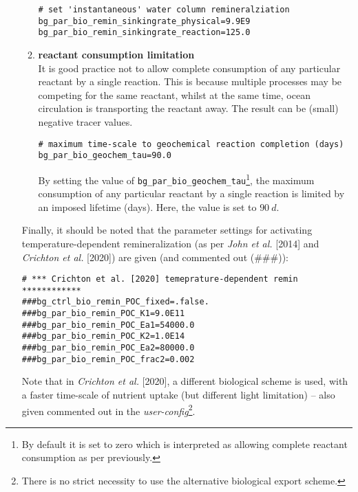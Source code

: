 \documentclass[11pt,fleqn]{book} %
\begin{document}
\begin{itemize}[noitemsep]
\begin{enumerate}[noitemsep]
\small\vspace{-1mm}\begin{verbatim}
# set 'instantaneous' water column remineralziation
bg_par_bio_remin_sinkingrate_physical=9.9E9
bg_par_bio_remin_sinkingrate_reaction=125.0
\end{verbatim}\vspace{-1mm}\normalsize
\vspace{1mm}
\item \textbf{reactant consumption limitation}
\\It is good practice not to allow complete consumption of any particular reactant by a single reaction. This is because multiple processes may be competing for the same reactant, whilst at the same time, ocean circulation is transporting the reactant away. The result can be (small) negative tracer values.
\small\vspace{-1mm}\begin{verbatim}
# maximum time-scale to geochemical reaction completion (days)
bg_par_bio_geochem_tau=90.0
\end{verbatim}\vspace{-1mm}\normalsize
By setting the value of \texttt{bg\_par\_bio\_geochem\_tau}\footnote{By default it is set to zero which is interpreted as allowing complete reactant consumption as per previously.}, the maximum consumption of any particular reactant by a single reaction is limited by an imposed lifetime (days). Here, the value is set to \(90\:d\).
\vspace{1mm}
\end{enumerate}
Finally, it should be noted that the parameter settings for activating temperature-dependent remineralization (as per \textit{John et al.} [2014] and \textit{Crichton et al.} [2020]) are given (and commented out (\#\#\#)):
\small\vspace{-1mm}\begin{verbatim}
# *** Crichton et al. [2020] temeprature-dependent remin ************
###bg_ctrl_bio_remin_POC_fixed=.false.
###bg_par_bio_remin_POC_K1=9.0E11
###bg_par_bio_remin_POC_Ea1=54000.0
###bg_par_bio_remin_POC_K2=1.0E14
###bg_par_bio_remin_POC_Ea2=80000.0
###bg_par_bio_remin_POC_frac2=0.002
\end{verbatim}\vspace{-1mm}\normalsize
Note that in \textit{Crichton et al.} [2020], a different biological scheme is used, with a faster time-scale of nutrient uptake (but different light limitation) -- also given commented out in the \textit{user-config}\footnote{There is no strict necessity to use the alternative biological export scheme.}.


\end{itemize}
\end{document}
